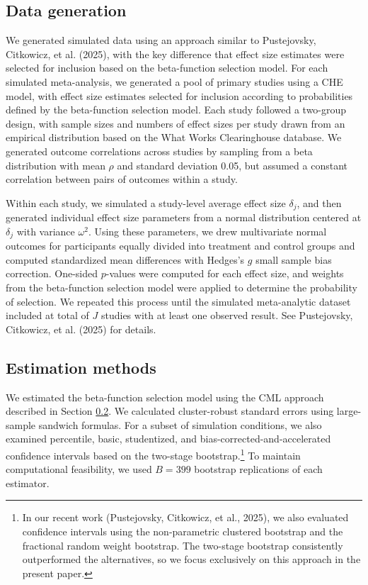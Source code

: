 \documentclass[
  american,
  man, donotrepeattitle,floatsintext]{apa7}
\begin{document}
\subsection{Data generation}\label{data-generation}

We generated simulated data using an approach similar to Pustejovsky, Citkowicz, et al. (2025), with the key difference that effect size estimates were selected for inclusion based on the beta-function selection model. For each simulated meta-analysis, we generated a pool of primary studies using a CHE model, with effect size estimates selected for inclusion according to probabilities defined by the beta-function selection model. Each study followed a two-group design, with sample sizes and numbers of effect sizes per study drawn from an empirical distribution based on the What Works Clearinghouse database. We generated outcome correlations across studies by sampling from a beta distribution with mean \(\rho\) and standard deviation 0.05, but assumed a constant correlation between pairs of outcomes within a study.

Within each study, we simulated a study-level average effect size \(\delta_j\), and then generated individual effect size parameters from a normal distribution centered at \(\delta_j\) with variance \(\omega^2\). Using these parameters, we drew multivariate normal outcomes for participants equally divided into treatment and control groups and computed standardized mean differences with Hedges's \(g\) small sample bias correction. One-sided \(p\)-values were computed for each effect size, and weights from the beta-function selection model were applied to determine the probability of selection. We repeated this process until the simulated meta-analytic dataset included at total of \(J\) studies with at least one observed result. See Pustejovsky, Citkowicz, et al. (2025) for details.

\subsection{Estimation methods}\label{estimation-methods}

We estimated the beta-function selection model using the CML approach described in Section \ref{estimation-methods}. We calculated cluster-robust standard errors using large-sample sandwich formulas. For a subset of simulation conditions, we also examined percentile, basic, studentized, and bias-corrected-and-accelerated confidence intervals based on the two-stage bootstrap.\footnote{In our recent work (Pustejovsky, Citkowicz, et al., 2025), we also evaluated confidence intervals using the non-parametric clustered bootstrap and the fractional random weight bootstrap. The two-stage bootstrap consistently outperformed the alternatives, so we focus exclusively on this approach in the present paper.} To maintain computational feasibility, we used \(B = 399\) bootstrap replications of each estimator.
\end{document}
